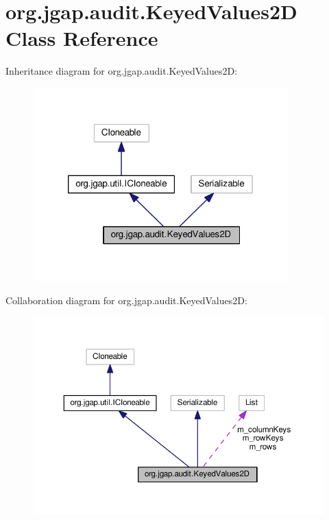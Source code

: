 \hypertarget{classorg_1_1jgap_1_1audit_1_1_keyed_values2_d}{\section{org.\-jgap.\-audit.\-Keyed\-Values2\-D Class Reference}
\label{classorg_1_1jgap_1_1audit_1_1_keyed_values2_d}
}


Inheritance diagram for org.\-jgap.\-audit.\-Keyed\-Values2\-D\-:
\nopagebreak
\begin{figure}[H]
\begin{center}
\leavevmode
\includegraphics[width=280pt]{classorg_1_1jgap_1_1audit_1_1_keyed_values2_d__inherit__graph}
\end{center}
\end{figure}


Collaboration diagram for org.\-jgap.\-audit.\-Keyed\-Values2\-D\-:
\nopagebreak
\begin{figure}[H]
\begin{center}
\leavevmode
\includegraphics[width=350pt]{classorg_1_1jgap_1_1audit_1_1_keyed_values2_d__coll__graph}
\end{center}
\end{figure}
